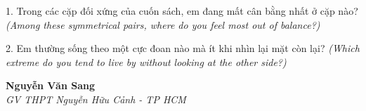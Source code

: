 \begin{tuhocnhanh}
1. Trong các cặp đối xứng của cuốn sách, em đang mất cân bằng nhất ở cặp nào? \textit{(Among these symmetrical pairs, where do you feel most out of balance?)}

2. Em thường sống theo một cực đoan nào mà ít khi nhìn lại mặt còn lại? \textit{(Which extreme do you tend to live by without looking at the other side?)}
\end{tuhocnhanh}

\begin{flushright}
\textbf{Nguyễn Văn Sang}\\
\textit{GV THPT Nguyễn Hữu Cảnh - TP HCM}
\end{flushright}

\ngancach
